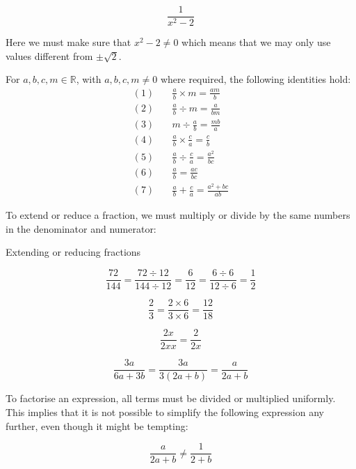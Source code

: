 \begin{example}

\[
\frac{1}{x^2 - 2}
\]    
\end{example}

Here we must make sure that \(x^2 - 2 \neq 0\) which means that we may only use values different from \(\pm\sqrt{2}\).

\begin{proposition}
For $a,b,c,m \in \mathbb{R}$, with $a,b,c,m \neq 0$ where required, the following identities hold:
\begingroup
\setlength{\jot}{8pt} %
\begin{align*}
(1) & \quad \frac{a}{b} \times m = \frac{am}{b} \\
(2) & \quad \frac{a}{b} \div m = \frac{a}{bm} \\
(3) & \quad m \div \frac{a}{b} = \frac{mb}{a} \\
(4) & \quad \frac{a}{b} \times \frac{c}{a} = \frac{c}{b} \\
(5) & \quad \frac{a}{b} \div \frac{c}{a} = \frac{a^2}{bc} \\
(6) & \quad \frac{a}{b} = \frac{ac}{bc} \\
(7) & \quad \frac{a}{b} + \frac{c}{a} = \frac{a^2 + bc}{ab}
\end{align*}
\endgroup
\end{proposition}

To extend or reduce a fraction, we must multiply or divide by the same numbers in the denominator and numerator:

\begin{example} Extending or reducing fractions

\[
\frac{72}{144} = \frac{72 \div 12}{144 \div 12} = \frac{6}{12} = \frac{6 \div 6}{12 \div 6} = \frac{1}{2}
\]

\[
\frac{2}{3} = \frac{2 \times 6}{3 \times 6} = \frac{12}{18}
\]

\[
\frac{2x}{2xx} = \frac{2}{2x}
\]

\[
\frac{3a}{6a + 3b} = \frac{3a}{3(2a + b)} = \frac{a}{2a + b}
\]    
\end{example}

To factorise an expression, all terms must be divided or multiplied uniformly. This implies that it is not possible to simplify the following expression any further, even though it might be tempting:

\[
\frac{a}{2a + b} \neq \frac{1}{2 + b}
\]

